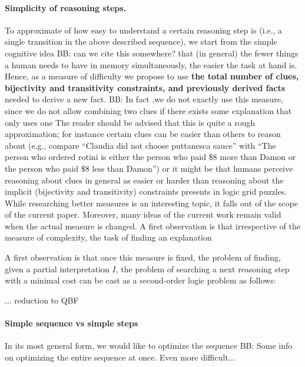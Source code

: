 \documentclass{ecai}
\newcommand\bart[1]{{\color{red}\textsc{BB}: #1}}
\begin{document}
\paragraph{Simplicity of reasoning steps.}
To approximate of how easy to understand a certain reasoning step is (i.e., a single transition in the above described sequence), we start from the simple cognitive idea \bart{can we cite this somewhere? } that (in general) the fewer things a human needs to have in memory simultaneously, the easier the task at hand is. 
Hence, as a measure of difficulty we propose to use \textbf{the total number of clues, bijectivity and transitivity constraints, and previously derived facts} needed to derive a new fact. \bart{In fact ,we do not exactly use this measure, since we do not allow combining two clues if there exists some explanation that only uses one}
The reader should be advised that this is quite a rough approximation; for instance certain clues can be easier than others to reason about (e.g., compare ``Claudia did not choose puttanesca sauce'' with ``The person who ordered rotini is either the person who paid \$8 more than Damon or the person who paid \$8 less than Damon'') or it might be that humans perceive reasoning about clues in general as easier or harder than reasoning about the implicit (bijectivity and transitivity) constraints presents in logic grid puzzles. While researching better measures is an interesting topic, it falls out of the scope of the current paper. Moreover, many ideas of the current work remain valid when the actual measure is changed. 
A first observation is that irrespective of the measure of complexity, the task of finding an explanation  


A first observation is that once this measure is fixed, the problem of finding, given a partial interpretation $I$, the problem of searching a next reasoning step with a minimal cost can be cast as a second-order logic problem as follows: 



... reduction to QBF \cite{kr/BogaertsTS16,kr/vanderHallenJ18}



\paragraph{Simple sequence vs simple steps}
In its most general form, we would like to optimize the sequence \bart{Some info on optimizing the entire sequence at once. Even more difficult... } 
\end{document}
